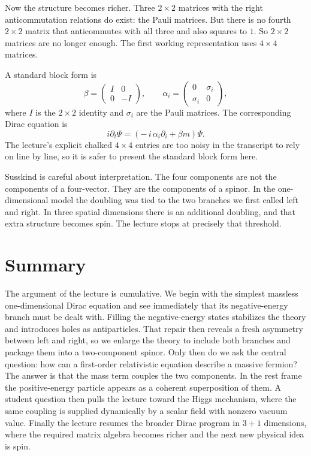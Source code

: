 Now the structure becomes richer. Three \(2\times 2\) matrices with the right anticommutation relations do exist: the Pauli matrices. But there is no fourth \(2\times 2\) matrix that anticommutes with all three and also squares to \(1\). So \(2\times 2\) matrices are no longer enough. The first working representation uses \(4\times 4\) matrices.

A standard block form is
\begin{equation}
\beta=
\begin{pmatrix}
I & 0\\
0 & -I
\end{pmatrix},
\qquad
\alpha_i=
\begin{pmatrix}
0 & \sigma_i\\
\sigma_i & 0
\end{pmatrix},
\end{equation}
where \(I\) is the \(2\times 2\) identity and \(\sigma_i\) are the Pauli matrices. The corresponding Dirac equation is
\begin{equation}
i\partial_t\Psi
=
\left(-\,i\,\alpha_i\partial_i+\beta m\right)\Psi.
\end{equation}
The lecture's explicit chalked \(4\times 4\) entries are too noisy in the transcript to rely on line by line, so it is safer to present the standard block form here.

Susskind is careful about interpretation. The four components are not the components of a four-vector. They are the components of a spinor. In the one-dimensional model the doubling was tied to the two branches we first called left and right. In three spatial dimensions there is an additional doubling, and that extra structure becomes spin. The lecture stops at precisely that threshold.

\section{Summary}

The argument of the lecture is cumulative. We begin with the simplest massless one-dimensional Dirac equation and see immediately that its negative-energy branch must be dealt with. Filling the negative-energy states stabilizes the theory and introduces holes as antiparticles. That repair then reveals a fresh asymmetry between left and right, so we enlarge the theory to include both branches and package them into a two-component spinor. Only then do we ask the central question: how can a first-order relativistic equation describe a massive fermion? The answer is that the mass term couples the two components. In the rest frame the positive-energy particle appears as a coherent superposition of them. A student question then pulls the lecture toward the Higgs mechanism, where the same coupling is supplied dynamically by a scalar field with nonzero vacuum value. Finally the lecture resumes the broader Dirac program in \(3+1\) dimensions, where the required matrix algebra becomes richer and the next new physical idea is spin.